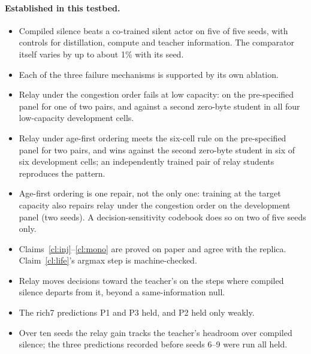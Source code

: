 \documentclass[11pt]{article}
\theoremstyle{definition}
\begin{document}
\paragraph{Established in this testbed.}
\begin{itemize}
\item Compiled silence beats a co-trained silent actor on five of five seeds, with controls for distillation, compute and
teacher information. The comparator itself varies by up to about 1\% with its seed.
\item Each of the three failure mechanisms is supported by its own ablation.
\item Relay under the congestion order fails at low capacity: on the pre-specified panel for one of two pairs, and against a
second zero-byte student in all four low-capacity development cells.
\item Relay under age-first ordering meets the six-cell rule on the pre-specified panel for two pairs, and wins against the
second zero-byte student in six of six development cells; an independently trained pair of relay students reproduces the
pattern.
\item Age-first ordering is one repair, not the only one: training at the target capacity also repairs relay under the
congestion order on the development panel (two seeds). A decision-sensitivity codebook does so on two of five seeds only.
\item Claims~\ref{cl:inj}--\ref{cl:mono} are proved on paper and agree with the replica. Claim~\ref{cl:life}'s argmax step is
machine-checked.
\item Relay moves decisions toward the teacher's on the steps where compiled silence departs from it, beyond a
same-information null.
\item The rich7 predictions P1 and P3 held, and P2 held only weakly.
\item Over ten seeds the relay gain tracks the teacher's headroom over compiled silence; the three predictions recorded
before seeds 6--9 were run all held.
\end{itemize}
\end{document}
